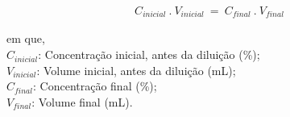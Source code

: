 \begin{gather}
	\label{equa:diluicao} 
    C_{inicial} \ . \ V_{inicial} \ = \ C_{final} \ . \ V_{final} 
\end{gather}

\noindent em que,\\
 $C_{inicial}$: Concentração inicial, antes da diluição (\%); \\
 $V_{inicial}$: Volume inicial, antes da diluição (mL); \\
 $C_{final}$: Concentração final (\%); \\
 $V_{final}$: Volume final (mL). \\
 





